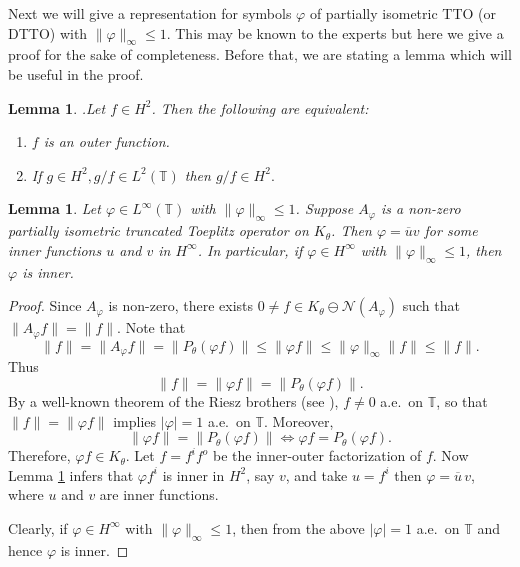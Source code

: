 \documentclass[12pt]{amsart}
\newcommand{\cln}{\mathcal{N}}
\newcommand{\T}{\mathbb{T}}
\theoremstyle{definition}
\theoremstyle{plain}
\newtheorem{lem}[thm]{Lemma}
\theoremstyle{definition}
\numberwithin{equation}{section}
\let\phi=\varphi
\begin{document}
	
	
Next we will give a representation for symbols $\phi$ of partially isometric TTO (or DTTO) with $\|\phi \|_{\infty} \leq 1$. This may be known to the experts but here we give a proof for the sake of completeness. Before that, we are stating a lemma which will be useful in the proof. 
 	
\begin{lem}\cite[Corollary 3, pp.\ 12]{NIK}.\label{Lem:inner outer factorization}
Let $f\in H^2$. Then the following are equivalent:
		\begin{enumerate}
			\item $f$ is an outer function.
			\item If $g\in H^2, g/f \in L^2(\T)$ then $g/f \in H^2.$
\end{enumerate}
\end{lem}
	
	
	
\begin{lem}\label{Characterisation}
Let $\phi\in L^{\infty}(\T)$ with $\|\phi\|_{\infty}\leq 1$. Suppose $A_{\phi}$ is a non-zero partially isometric truncated Toeplitz operator on $K_{\theta}$. Then 
$\phi=\overline{u}v$ for some inner functions $u$ and $v$ in $H^{\infty}$. In particular, if $\phi\in H^{\infty}$ with $\|\phi\|_{\infty}\leq 1$, then $\phi$ is inner.
\end{lem}
	
	
\begin{proof}
Since $A_\phi$ is non-zero, there exists $0 \neq f \in K_{\theta}\ominus \cln(A_\phi)$ such that $\|A_{\phi}f\|=\|f\|.$ Note that
\[
\|f\|=\|A_\phi f\|=\|P_\theta(\phi f)\|\leq \|\phi f\|\leq \|\phi\|_\infty \|f\|\leq \|f\|.
\]
Thus 
\[
\|f\|=\|\phi f\|=\|P_{\theta}(\phi f)\|.
\]		
By a well-known theorem of the Riesz brothers (see \cite[Chapter 6]{RD}), $f\neq 0$ a.e.\ on $\T$, so that $\|f\|=\|\phi f\|$ implies $|\phi|=1$ a.e.\ on $\T$. Moreover, 
\[
\|\phi f\|=\|P_\theta(\phi f)\| \iff \phi f=P_{\theta}(\phi f).
\]
Therefore, $\phi f\in K_{\theta}$. Let $f=f^{i}f^{o}$ be the inner-outer factorization of $f$. Now Lemma \ref{Lem:inner outer factorization} infers that $\phi f^i$ is inner in $H^2$, say $v$, and take $u=f^i$ then $\phi=\overline{u}\,v$, where $u$ and $v$ are inner functions. 

Clearly, if $\phi\in H^{\infty}$ with $\|\phi\|_{\infty}\leq 1$, then from the above $|\phi|=1$ a.e.\ on $\T$ and hence $\phi$ is inner. 
\end{proof}
	
\end{document}
